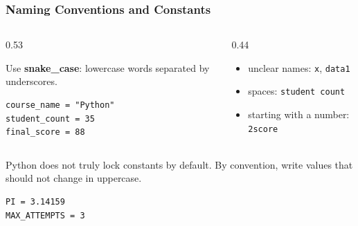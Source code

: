 \documentclass[aspectratio=169,10pt]{beamer}
\newcommand{\keyword}[1]{\textcolor{PrimaryBlue}{\textbf{#1}}}
\begin{document}
\begin{frame}[fragile]
\frametitle{Naming Conventions and Constants}
\begin{columns}[T,totalwidth=\textwidth]
\begin{column}{0.53\textwidth}
\begin{tcolorbox}[lecturebox,title=Good variable names]
Use \keyword{snake\_case}: lowercase words separated by underscores.
\end{tcolorbox}

\begin{lstlisting}[style=pycode]
course_name = "Python"
student_count = 35
final_score = 88
\end{lstlisting}
\end{column}
\begin{column}{0.44\textwidth}
\begin{tcolorbox}[lecturebox,title=Avoid]
\begin{itemize}\setlength\itemsep{0.04cm}
  \item unclear names: \texttt{x}, \texttt{data1}
  \item spaces: \texttt{student count}
  \item starting with a number: \texttt{2score}
\end{itemize}
\end{tcolorbox}
\end{column}
\end{columns}

\vspace{0.2cm}
\begin{tcolorbox}[lecturebox,title=Constants in Python]
Python does not truly lock constants by default. By convention, write values that should not change in uppercase.
\end{tcolorbox}
\begin{lstlisting}[style=pycode]
PI = 3.14159
MAX_ATTEMPTS = 3
\end{lstlisting}
\end{frame}
\end{document}

